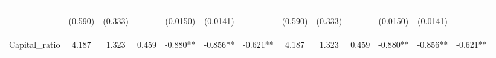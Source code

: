\documentclass[]{article}
\begin{document}
\begin{center}
\begin{tabular}{lcccccccccccc}
\vspace{4pt} & \begin{footnotesize}(0.590)\end{footnotesize} & \begin{footnotesize}(0.333)\end{footnotesize} & \begin{footnotesize}\end{footnotesize} & \begin{footnotesize}(0.0150)\end{footnotesize} & \begin{footnotesize}(0.0141)\end{footnotesize} & \begin{footnotesize}\end{footnotesize} & \begin{footnotesize}(0.590)\end{footnotesize} & \begin{footnotesize}(0.333)\end{footnotesize} & \begin{footnotesize}\end{footnotesize} & \begin{footnotesize}(0.0150)\end{footnotesize} & \begin{footnotesize}(0.0141)\end{footnotesize} & \begin{footnotesize}\end{footnotesize} \\
Capital\_ratio & 4.187 & 1.323 & 0.459 & -0.880** & -0.856** & -0.621** & 4.187 & 1.323 & 0.459 & -0.880** & -0.856** & -0.621** \\

\end{tabular}
\end{center}
\end{document}
